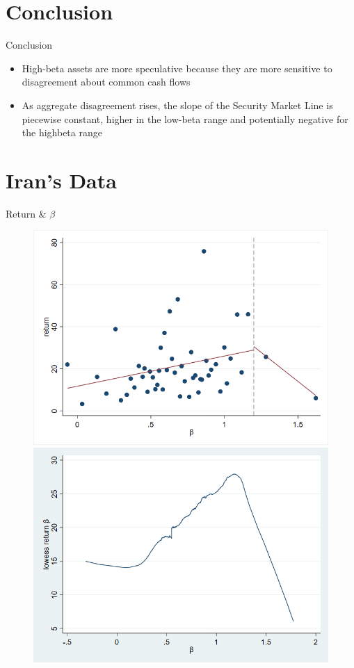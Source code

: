 \documentclass{beamer}
\begin{document}
\section{Conclusion}
\begin{frame}{Conclusion}
\begin{itemize}
\item High-beta assets are more speculative because they are more sensitive to disagreement about common cash flows
\item As aggregate disagreement rises, the slope of the Security Market Line is piecewise constant, higher in the low-beta range and potentially negative for the highbeta range
\end{itemize}
\end{frame}
\appendix
\section{Iran's Data}

\begin{frame}{Return \& $ \beta $}

\begin{figure}
\centering
\includegraphics[width=0.45\linewidth]{mygraph1}
\includegraphics[width=0.45\linewidth]{mygraph2}
\label{fig:mygraph0}
\end{figure}

\end{frame}
\end{document}
